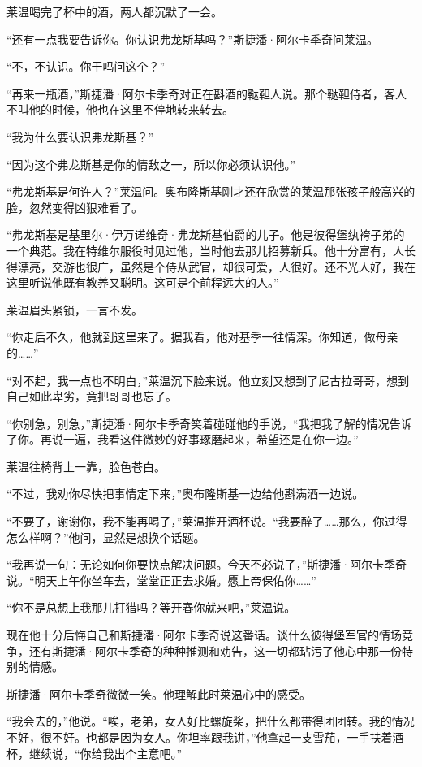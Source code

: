 \par 莱温喝完了杯中的酒，两人都沉默了一会。
\par “还有一点我要告诉你。你认识弗龙斯基吗？”斯捷潘·阿尔卡季奇问莱温。
\par “不，不认识。你干吗问这个？”
\par “再来一瓶酒，”斯捷潘·阿尔卡季奇对正在斟酒的鞑靼人说。那个鞑靼侍者，客人不叫他的时候，他也在这里不停地转来转去。
\par “我为什么要认识弗龙斯基？”
\par “因为这个弗龙斯基是你的情敌之一，所以你必须认识他。”
\par “弗龙斯基是何许人？”莱温问。奥布隆斯基刚才还在欣赏的莱温那张孩子般高兴的脸，忽然变得凶狠难看了。
\par “弗龙斯基是基里尔·伊万诺维奇·弗龙斯基伯爵的儿子。他是彼得堡纨袴子弟的一个典范。我在特维尔服役时见过他，当时他去那儿招募新兵。他十分富有，人长得漂亮，交游也很广，虽然是个侍从武官，却很可爱，人很好。还不光人好，我在这里听说他既有教养又聪明。这可是个前程远大的人。”
\par 莱温眉头紧锁，一言不发。
\par “你走后不久，他就到这里来了。据我看，他对基季一往情深。你知道，做母亲的……”
\par “对不起，我一点也不明白，”莱温沉下脸来说。他立刻又想到了尼古拉哥哥，想到自己如此卑劣，竟把哥哥也忘了。
\par “你别急，别急，”斯捷潘·阿尔卡季奇笑着碰碰他的手说，“我把我了解的情况告诉了你。再说一遍，我看这件微妙的好事琢磨起来，希望还是在你一边。”
\par 莱温往椅背上一靠，脸色苍白。
\par “不过，我劝你尽快把事情定下来，”奥布隆斯基一边给他斟满酒一边说。
\par “不要了，谢谢你，我不能再喝了，”莱温推开酒杯说。“我要醉了……那么，你过得怎么样啊？”他问，显然是想换个话题。
\par “我再说一句：无论如何你要快点解决问题。今天不必说了，”斯捷潘·阿尔卡季奇说。“明天上午你坐车去，堂堂正正去求婚。愿上帝保佑你……”
\par “你不是总想上我那儿打猎吗？等开春你就来吧，”莱温说。
\par 现在他十分后悔自己和斯捷潘·阿尔卡季奇说这番话。谈什么彼得堡军官的情场竞争，还有斯捷潘·阿尔卡季奇的种种推测和劝告，这一切都玷污了他心中那一份特别的情感。
\par 斯捷潘·阿尔卡季奇微微一笑。他理解此时莱温心中的感受。
\par “我会去的，”他说。“唉，老弟，女人好比螺旋桨，把什么都带得团团转。我的情况不好，很不好。也都是因为女人。你坦率跟我讲，”他拿起一支雪茄，一手扶着酒杯，继续说，“你给我出个主意吧。”

